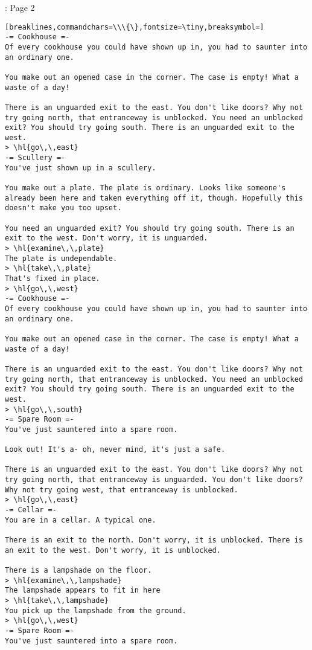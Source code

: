 \begin{AIbox}[width=0.9\textwidth]{\DV: Page 2}
\begin{Verbatim}[breaklines,commandchars=\\\{\},fontsize=\tiny,breaksymbol=]
-= Cookhouse =-
Of every cookhouse you could have shown up in, you had to saunter into an ordinary one.

You make out an opened case in the corner. The case is empty! What a waste of a day!

There is an unguarded exit to the east. You don't like doors? Why not try going north, that entranceway is unblocked. You need an unblocked exit? You should try going south. There is an unguarded exit to the west.
> \hl{go\,\,east}
-= Scullery =-
You've just shown up in a scullery.

You make out a plate. The plate is ordinary. Looks like someone's already been here and taken everything off it, though. Hopefully this doesn't make you too upset.

You need an unguarded exit? You should try going south. There is an exit to the west. Don't worry, it is unguarded.
> \hl{examine\,\,plate}
The plate is undependable.
> \hl{take\,\,plate}
That's fixed in place.
> \hl{go\,\,west}
-= Cookhouse =-
Of every cookhouse you could have shown up in, you had to saunter into an ordinary one.

You make out an opened case in the corner. The case is empty! What a waste of a day!

There is an unguarded exit to the east. You don't like doors? Why not try going north, that entranceway is unblocked. You need an unblocked exit? You should try going south. There is an unguarded exit to the west.
> \hl{go\,\,south}
-= Spare Room =-
You've just sauntered into a spare room.

Look out! It's a- oh, never mind, it's just a safe.

There is an unguarded exit to the east. You don't like doors? Why not try going north, that entranceway is unguarded. You don't like doors? Why not try going west, that entranceway is unblocked.
> \hl{go\,\,east}
-= Cellar =-
You are in a cellar. A typical one.

There is an exit to the north. Don't worry, it is unblocked. There is an exit to the west. Don't worry, it is unblocked.

There is a lampshade on the floor.
> \hl{examine\,\,lampshade}
The lampshade appears to fit in here
> \hl{take\,\,lampshade}
You pick up the lampshade from the ground.
> \hl{go\,\,west}
-= Spare Room =-
You've just sauntered into a spare room.


\end{Verbatim}
\end{AIbox}

